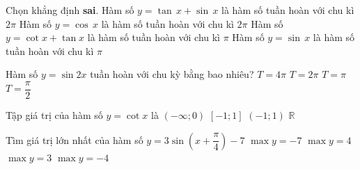 \begin{ex}%
Chọn khẳng định \textbf{sai}.
\choice
{Hàm số $y=\tan \,x+\sin \,x$ là hàm số tuần hoàn với chu kì $2\pi $}
{Hàm số $y=\cos \,x$ là hàm số tuần hoàn với chu kì $2\pi $}
{Hàm số $y=\cot x+\tan x$ là hàm số tuần hoàn với chu kì $\pi $}
{\True Hàm số $y=\sin \,x$ là hàm số tuần hoàn với chu kì $\pi $}
\end{ex}
\begin{ex}%
Hàm số $y=\sin 2x$ tuần hoàn với chu kỳ bằng bao nhiêu?
\choice
{$T=4\pi $}
{$T=2\pi $}
{\True $T=\pi $}
{$T=\dfrac{\pi }{2}$}
\end{ex}
\begin{ex}%
Tập giá trị của hàm số $y=\cot x$ là
\choice
{$\left( -\infty ;0 \right)$}
{$\left[ -1;1 \right]$}
{$\left( -1;1 \right)$}
{\True $\mathbb{R}$}
\end{ex}
\begin{ex}%
Tìm giá trị lớn nhất của hàm số $y=3\sin \left( x+\dfrac{\pi }{4} \right)-7$
\choice
{$\max y=-7$}
{$\max y=4$}
{$\max y=3$}
{\True $\max y=-4$}
\end{ex}

